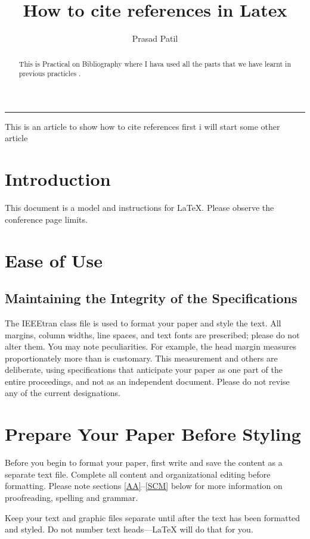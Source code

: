 \documentclass[12pt]{article}
\title{How to cite references in Latex}
\author{Prasad Patil}
\begin{document}
\maketitle
\hrule
\hspace{2cm}

This is an article to show how to cite references first i will start some other article  

\begin{abstract}
  This is Practical on Bibliography where I hava used all the parts that we have learnt in previous practicles .
\end{abstract}


\section{Introduction}
This document is a model and instructions for \LaTeX.
Please observe the conference page limits.

\section{Ease of Use}

\subsection{Maintaining the Integrity of the Specifications}

The IEEEtran class file is used to format your paper and style the text. All margins,
column widths, line spaces, and text fonts are prescribed; please do not
alter them. You may note peculiarities. For example, the head margin
measures proportionately more than is customary. This measurement
and others are deliberate, using specifications that anticipate your paper
as one part of the entire proceedings, and not as an independent document.
Please do not revise any of the current designations.

\section{Prepare Your Paper Before Styling}
Before you begin to format your paper, first write and save the content as a
separate text file. Complete all content and organizational editing before
formatting. Please note sections \ref{AA}--\ref{SCM} below for more information on
proofreading, spelling and grammar.

Keep your text and graphic files separate until after the text has been
formatted and styled. Do not number text heads---{\LaTeX} will do that
for you.
\end{document}
